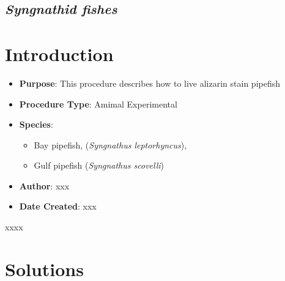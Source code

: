 \documentclass[
  letterpaper,
  DIV=11,
  numbers=noendperiod]{scrreprt}
\providecommand{\tightlist}{%
  \setlength{\itemsep}{0pt}\setlength{\parskip}{0pt}}\usepackage{longtable,booktabs,array}
\begin{document}
\hypertarget{syngnathid-fishes}{%
\subsection{\texorpdfstring{\emph{Syngnathid
fishes}}{Syngnathid fishes}}\label{syngnathid-fishes}}

\hypertarget{introduction-62}{%
\section{Introduction}\label{introduction-62}}

\begin{itemize}
\tightlist
\item
  \textbf{Purpose}: This procedure describes how to live alizarin stain
  pipefish
\item
  \textbf{Procedure Type}: Amimal Experimental
\item
  \textbf{Species}:

  \begin{itemize}
  \tightlist
  \item
    Bay pipefish, (\emph{Syngnathus leptorhyncus}),
  \item
    Gulf pipefish (\emph{Syngnathus scovelli})
  \end{itemize}
\item
  \textbf{Author}: xxx
\item
  \textbf{Date Created}: xxx
\end{itemize}

\begin{tcolorbox}[enhanced jigsaw, rightrule=.15mm, title=\textcolor{quarto-callout-warning-color}{\faExclamationTriangle}\hspace{0.5em}{NOTES}, titlerule=0mm, opacitybacktitle=0.6, toprule=.15mm, bottomrule=.15mm, opacityback=0, left=2mm, colframe=quarto-callout-warning-color-frame, breakable, coltitle=black, colback=white, colbacktitle=quarto-callout-warning-color!10!white, bottomtitle=1mm, leftrule=.75mm, toptitle=1mm, arc=.35mm]

xxxx

\end{tcolorbox}

\hypertarget{solutions-50}{%
\section{Solutions}\label{solutions-50}}
\end{document}
